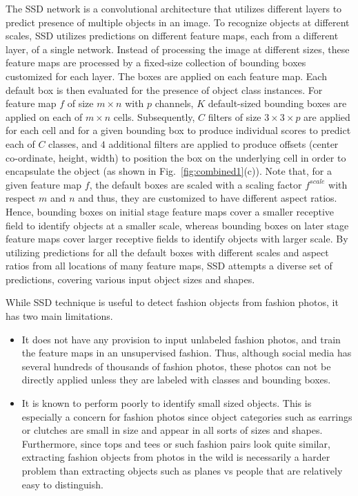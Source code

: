 \documentclass[sigconf]{acmart}
\begin{document}
The SSD network is a convolutional architecture 
that utilizes different layers to predict presence
of multiple objects in an image.
To recognize objects at different scales,
SSD utilizes predictions on different feature maps,
each from a different layer, of a single network.
Instead of processing the image at different sizes,
these feature maps are processed 
by a fixed-size collection of bounding boxes
customized for each layer.
The boxes are applied on each feature map.
Each default box is then evaluated for 
the presence of object class instances.
For feature map $f$ of size $m \times n$ with $p$ channels,
$K$ default-sized bounding boxes are applied on each of $m \times n$ cells.
Subsequently, $C$ filters of size $3 \times 3 \times p$ 
are applied for each cell and for a given bounding box to produce individual scores
to predict each of $C$ classes,
and $4$ additional filters are applied to produce offsets
(center co-ordinate, height, width) to position the box
on the underlying cell in order to encapsulate the object
(as shown in Fig.~\ref{fig:combined1}(c)).
Note that, for a given feature map $f$, 
the default boxes are scaled with a scaling factor
$f^{scale}$ with respect $m$ and $n$ and thus, they
are customized to have different aspect ratios.
Hence, bounding boxes on initial stage feature maps cover a smaller receptive field to identify
objects at a smaller scale, whereas bounding boxes on later stage feature maps
cover larger receptive fields to identify objects with larger scale.
By utilizing predictions 
for all the default boxes with different scales and aspect ratios
from all locations of many feature maps, 
SSD attempts a diverse set of predictions, covering
various input object sizes and shapes.

While SSD technique is useful to detect fashion objects from fashion photos,
it has two main limitations.
\begin{itemize}
\item It does not have any provision to input unlabeled fashion photos, and
train the feature maps in an unsupervised fashion. Thus, although social media
has several hundreds of thousands of fashion photos, these photos can not be
directly applied unless they are labeled with classes and bounding boxes. 
\item It is known to perform poorly to identify small sized objects.
This is especially a concern for fashion photos since object categories such
as earrings or clutches are small in size and appear in all sorts of sizes and shapes.
Furthermore, since tops and tees or such fashion pairs look quite similar,
extracting fashion objects from photos in the wild is necessarily a harder problem
than extracting objects such as planes vs people that are relatively easy to distinguish.
\end{itemize}
\end{document}
